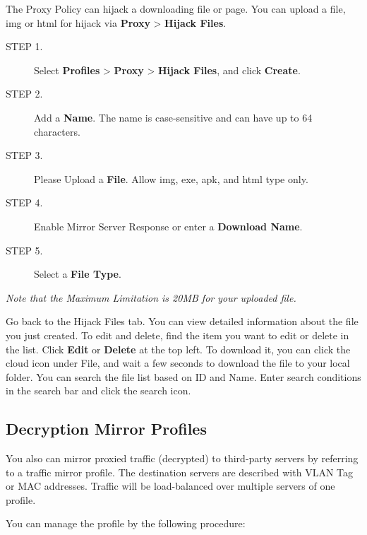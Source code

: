 The Proxy Policy can hijack a downloading file or page. You can upload a file, img or html for hijack via \textbf{Proxy} > \textbf{Hijack Files}.

\begin{description}
    \item[STEP 1.]	Select \textbf{Profiles} > \textbf{Proxy} > \textbf{Hijack Files}, and click \textbf{Create}.
    \item[STEP 2.]	Add a \textbf{Name}. The name is case-sensitive and can have up to 64 characters.
    \item[STEP 3.]	Please Upload a \textbf{File}. Allow img, exe, apk, and html type only.
    \item[STEP 4.]	Enable Mirror Server Response or enter a \textbf{Download Name}. 
    \item[STEP 5.]	Select a \textbf{File Type}. 
\end{description} 

\notemark\textit{Note that the Maximum Limitation is 20MB for your uploaded file.}


Go back to the Hijack Files tab. You can view detailed information about the file you just created. To edit and delete, find the item you want to edit or delete in the list. 
Click \textbf{Edit} or \textbf{Delete} at the top left. To download it, you can click the cloud icon under File, and wait a few seconds to download the file to your local folder. 
You can search the file list based on ID and Name. Enter search conditions in the search bar and click the search icon.

\subsection*{\hypertarget{link:Decryption Mirror Profiles}{Decryption Mirror Profiles}}
\label{sec:decrypt:profile:mirror}

You also can mirror proxied traffic (decrypted) to third-party servers by referring to a traffic mirror profile. 
The destination servers are described with VLAN Tag or MAC addresses. Traffic will be load-balanced over multiple servers of one profile.


You can manage the profile by the following procedure:

